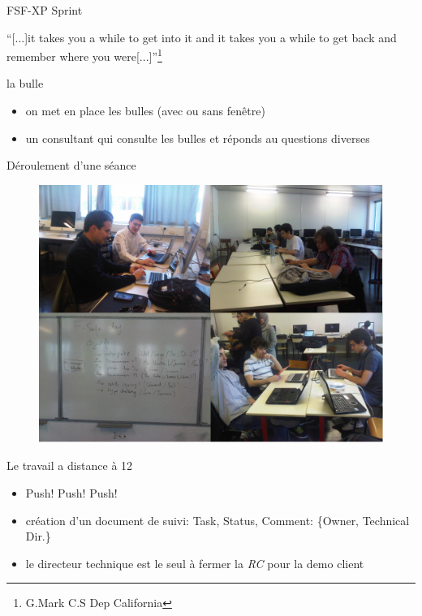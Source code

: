 \begin{frame}{FSF-XP Sprint}
  \begin{block}{}
    ``[...]it takes you a while to get into it and it takes 
    you a while to get back and remember where you were[...]''\footnote{G.Mark C.S Dep California}
  \end{block}
  \begin{block}{la bulle}
    \begin{itemize}
    \item on met en place les bulles (avec ou sans fenêtre)
    \item un consultant qui consulte les bulles et réponds au questions diverses
    \end{itemize}
  \end{block}
\end{frame}


\begin{frame}{Déroulement d'une séance}
  \begin{figure}
    \includegraphics[scale=0.27]{img/FSafeDay.png}
  \end{figure} 
\end{frame}

\begin{frame}{Le travail a distance à 12}
  \begin{block}{}
    \begin{itemize}
      \item Push! Push! Push!
      \item création d'un document de suivi: Task, Status, Comment: \{Owner, Technical Dir.\}
      \item le directeur technique est le seul à fermer la \emph{RC} pour la demo client
    \end{itemize}
  \end{block}
\end{frame}


